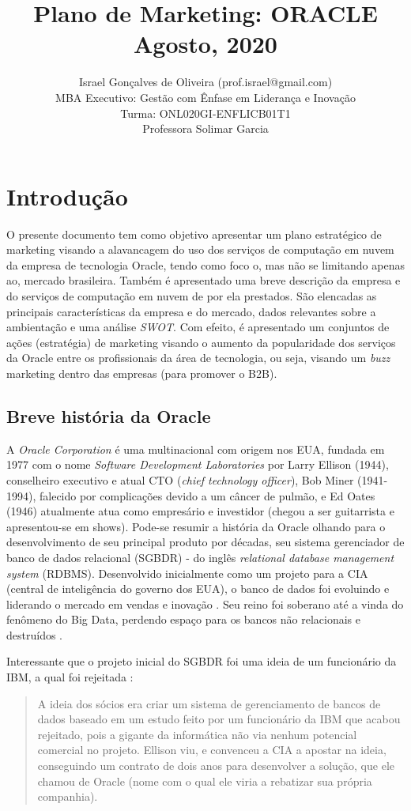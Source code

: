 \documentclass[a4paper]{article}
\title{Plano de Marketing: ORACLE \\
Agosto, 2020
}
\author{
    Israel Gonçalves de Oliveira (prof.israel@gmail.com) \\
    MBA Executivo: Gestão com Ênfase em Liderança e Inovação \\
    Turma: ONL020GI-ENFLICB01T1 \\
    Professora Solimar Garcia}
\begin{document}
 

\maketitle

\section{Introdução}

O presente documento tem como objetivo apresentar um plano estratégico de marketing visando a alavancagem do uso dos serviços de computação em nuvem da empresa de tecnologia Oracle, tendo como foco o, mas não se limitando apenas ao, mercado brasileira. Também é apresentado uma breve descrição da empresa e do serviços de computação em nuvem de  por ela prestados. São elencadas as principais características da empresa e do mercado, dados relevantes sobre a ambientação e uma análise \emph{SWOT}. Com efeito, é apresentado um conjuntos de ações (estratégia) de marketing visando o aumento da popularidade dos serviços da Oracle entre os profissionais da área de tecnologia, ou seja, visando um \emph{buzz} marketing dentro das empresas (para promover o B2B).

\subsection{Breve história da Oracle}
A \emph{Oracle Corporation} é uma multinacional com origem nos EUA, fundada em 1977 com o nome \emph{Software Development Laboratories} por Larry Ellison (1944), conselheiro executivo e atual CTO (\emph{chief technology officer}), Bob Miner (1941-1994), falecido por complicações devido a um câncer de pulmão, e Ed Oates (1946) atualmente atua como empresário e investidor (chegou a ser guitarrista e apresentou-se em shows). Pode-se resumir a história da Oracle olhando para o desenvolvimento de seu principal produto por décadas, seu sistema gerenciador de banco de dados relacional (SGBDR) - do inglês \emph{relational database management system} (RDBMS). Desenvolvido inicialmente como um projeto para a CIA (central de inteligência do governo dos EUA), o banco de dados foi evoluindo e liderando o mercado em vendas e inovação \cite{OracleCo5:online}. Seu reino foi soberano até a vinda do fenômeno do Big Data, perdendo espaço para os bancos não relacionais e destruídos \cite{NoSQLWi86:online}.

Interessante que o projeto inicial do SGBDR foi uma ideia de um funcionário da IBM, a qual foi rejeitada \cite{DonodaOr98:online}:
\begin{quotation}
A ideia dos sócios era criar um sistema de gerenciamento de bancos de dados baseado em um estudo feito por um funcionário da IBM que acabou rejeitado, pois a gigante da informática não via nenhum potencial comercial no projeto. Ellison viu, e convenceu a CIA a apostar na ideia, conseguindo um contrato de dois anos para desenvolver a solução, que ele chamou de Oracle (nome com o qual ele viria a rebatizar sua própria companhia).
\end{quotation}
\end{document}
